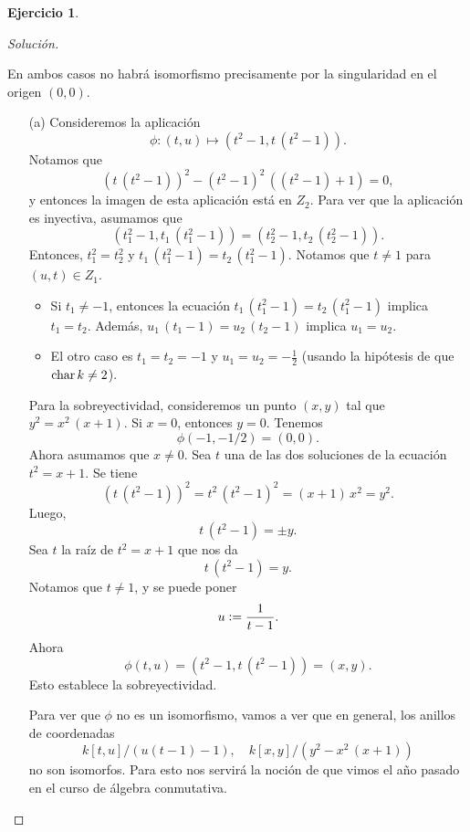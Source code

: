 \documentclass{article}
\theoremstyle{definition}
\newtheorem{ejerc}{Ejercicio}
\newenvironment{solucion}{\begin{proof}[Solución]}{\end{proof}}
\begin{document}
\begin{ejerc}
\begin{solucion}
\begin{center}
    \end{center}
    En ambos casos no habrá isomorfismo precisamente por la singularidad en el
    origen $(0,0)$.

    \begin{enumerate}
    \item[(a)] Consideremos la aplicación
      $$\phi\colon (t, u) \mapsto (t^2 - 1, t\,(t^2 - 1)).$$
      Notamos que
      $$(t\,(t^2 - 1))^2 - (t^2 - 1)^2\,((t^2 - 1) + 1) = 0,$$
      y entonces la imagen de esta aplicación está en $Z_2$. Para ver que la
      aplicación es inyectiva, asumamos que
      $$(t_1^2 - 1, t_1\,(t_1^2 - 1)) = (t_2^2 - 1, t_2\,(t_2^2 - 1)).$$
      Entonces, $t_1^2 = t_2^2$ y $t_1\,(t_1^2 - 1) = t_2\,(t_1^2 - 1)$. Notamos
      que $t \ne 1$ para $(u,t) \in Z_1$.

      \begin{itemize}
      \item Si $t_1 \ne -1$, entonces la ecuación
        $t_1\,(t_1^2 - 1) = t_2\,(t_1^2 - 1)$ implica $t_1 = t_2$. Además,
        $u_1\,(t_1-1) = u_2\,(t_2-1)$ implica $u_1 = u_2$.

      \item El otro caso es $t_1 = t_2 = -1$ y $u_1 = u_2 = -\frac{1}{2}$
        (usando la hipótesis de que $\operatorname{char} k \ne 2$).
      \end{itemize}

      Para la sobreyectividad, consideremos un punto $(x,y)$ tal que
      $y^2 = x^2\,(x+1)$. Si $x = 0$, entonces $y = 0$. Tenemos
      $$\phi (-1,-1/2) = (0,0).$$
      Ahora asumamos que $x \ne 0$. Sea $t$ una de las dos soluciones de la
      ecuación $t^2 = x + 1$. Se tiene
      $$(t\,(t^2-1))^2 = t^2\,(t^2-1)^2 = (x+1)\,x^2 = y^2.$$
      Luego,
      $$t\,(t^2-1) = \pm y.$$
      Sea $t$ la raíz de $t^2 = x+1$ que nos da
      $$t\,(t^2-1) = y.$$
      Notamos que $t \ne 1$, y se puede poner
      $$u \mathrel{\mathop:}= \frac{1}{t-1}.$$
      Ahora
      $$\phi (t,u) = (t^2 - 1, t\,(t^2-1)) = (x, y).$$
      Esto establece la sobreyectividad.

      Para ver que $\phi$ no es un isomorfismo, vamos a ver que en general, los
      anillos de coordenadas
      $$k [t,u] / (u(t-1)-1), \quad k [x,y] / (y^2 - x^2\,(x+1))$$
      no son isomorfos. Para esto nos servirá la noción de
       que vimos el año pasado en el curso de
      álgebra conmutativa.


\end{enumerate}
\end{solucion}
\end{ejerc}
\end{document}
